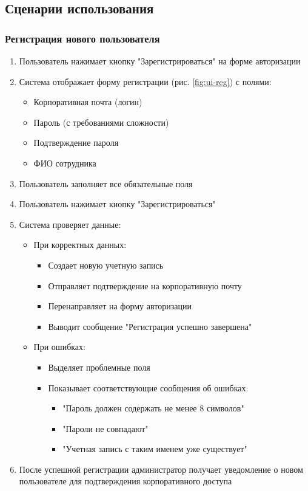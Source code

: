 \subsection{Сценарии использования}

\subsubsection{Регистрация нового пользователя}
\begin{enumerate}
	\item Пользователь нажимает кнопку "Зарегистрироваться" на форме авторизации
	\item Система отображает форму регистрации (рис. \ref{fig:ui-reg}) с полями:
	\begin{itemize}
		\item Корпоративная почта (логин)
		\item Пароль (с требованиями сложности)
		\item Подтверждение пароля
		\item ФИО сотрудника
	\end{itemize}
	\item Пользователь заполняет все обязательные поля
	\item Пользователь нажимает кнопку "Зарегистрироваться"
	\item Система проверяет данные:
	\begin{itemize}
		\item При корректных данных:
		\begin{itemize}
			\item Создает новую учетную запись
			\item Отправляет подтверждение на корпоративную почту
			\item Перенаправляет на форму авторизации
			\item Выводит сообщение "Регистрация успешно завершена"
		\end{itemize}
		\item При ошибках:
		\begin{itemize}
			\item Выделяет проблемные поля
			\item Показывает соответствующие сообщения об ошибках:
			\begin{itemize}
				\item "Пароль должен содержать не менее 8 символов"
				\item "Пароли не совпадают"
				\item "Учетная запись с таким именем уже существует"
			\end{itemize}
		\end{itemize}
	\end{itemize}
	\item После успешной регистрации администратор получает уведомление о новом пользователе для подтверждения корпоративного доступа
\end{enumerate}

